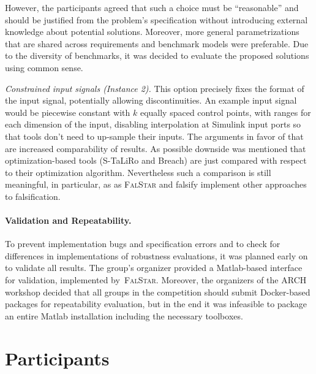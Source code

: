 \documentclass[a4paper]{easychair}
\newcommand{\STaLiRo}{S-TaLiRo\xspace}
\newcommand{\Breach}{Breach\xspace}
\newcommand{\FalStar}{\textsc{FalStar}\xspace}
\newcommand{\falsify}{falsify\xspace}
\begin{document}
	However, the participants agreed that such a choice must be
    ``reasonable'' and should be justified from the problem's
    specification without introducing external knowledge about
    potential solutions.  Moreover, more general parametrizations that
    are shared across requirements and benchmark models were
    preferable.  Due to the diversity of benchmarks, it was decided to
    evaluate the proposed solutions using common sense.

	\emph{Constrained input signals (Instance 2).}  This option
    precisely fixes the format of the input signal, potentially
    allowing discontinuities. An example input signal would be
    piecewise constant with $k$ equally spaced control points, with
    ranges for each dimension of the input, disabling interpolation at
    Simulink input ports so that tools don't need to up-sample their
    inputs.  The arguments in favor of that are increased
    comparability of results.  As possible downside was mentioned that
    optimization-based tools (\STaLiRo and \Breach) are just compared with
    respect to their optimization algorithm.
    Nevertheless such a comparison is still meaningful, in particular,
    as as \FalStar and \falsify implement other approaches to falsification.

    \paragraph{Validation and Repeatability.}

    To prevent implementation bugs and specification errors and to
    check for differences in implementations of robustness
    evaluations, it was planned early on to validate all results.  The
    group's organizer provided a Matlab-based interface for
    validation, implemented by~\FalStar.  Moreover, the organizers of
    the ARCH workshop decided that all groups in the competition
    should submit Docker-based packages for repeatability evaluation,
    but in the end it was infeasible to package an entire Matlab
    installation including the necessary toolboxes.

	\section{Participants}
	\label{sec:participants}
\end{document}
